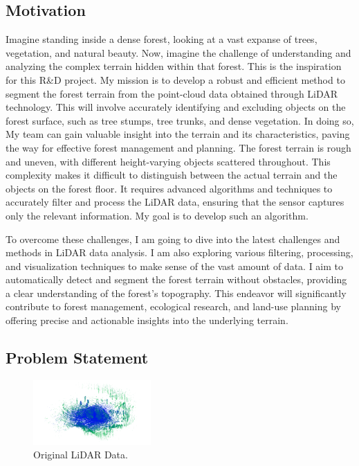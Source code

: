 \documentclass[../report.tex]{subfiles}
\begin{document}
    \subsection{Motivation}
    \label{sec:introduction:motivation}
Imagine standing inside a dense forest, looking at a vast expanse of trees, vegetation, and natural beauty. Now, imagine the challenge of understanding and analyzing the complex terrain hidden within that forest. This is the inspiration for this R\&D project. My mission is to develop a robust and efficient method to segment the forest terrain from the point-cloud data obtained through LiDAR technology. This will involve accurately identifying and excluding objects on the forest surface, such as tree stumps, tree trunks, and dense vegetation. In doing so, My team can gain valuable insight into the terrain and its characteristics, paving the way for effective forest management and planning.
{The forest terrain is rough and uneven, with different height-varying objects scattered throughout. This complexity makes it difficult to distinguish between the actual terrain and the objects on the forest floor. It requires advanced algorithms and techniques to accurately filter and process the LiDAR data, ensuring that the sensor captures only the relevant information. My goal is to develop such an algorithm.}

{To overcome these challenges, I am going to dive into the latest challenges and methods in LiDAR data analysis. I am also exploring various filtering, processing, and visualization techniques to make sense of the vast amount of data. I aim to automatically detect and segment the forest terrain without obstacles, providing a clear understanding of the forest's topography. This endeavor will significantly contribute to forest management, ecological research, and land-use planning by offering precise and actionable insights into the underlying terrain.}
    
    \subsection{Problem Statement}
    \label{sec:introduction:problem_statement}
    \begin{figure}[H]
        \centering
        \includegraphics[width=0.4\textwidth]{rnd-project-report-main/figures/Original_data.png}
        \caption{Original LiDAR Data.}
        \label{fig:raw_data}
    \end{figure}
\end{document}
